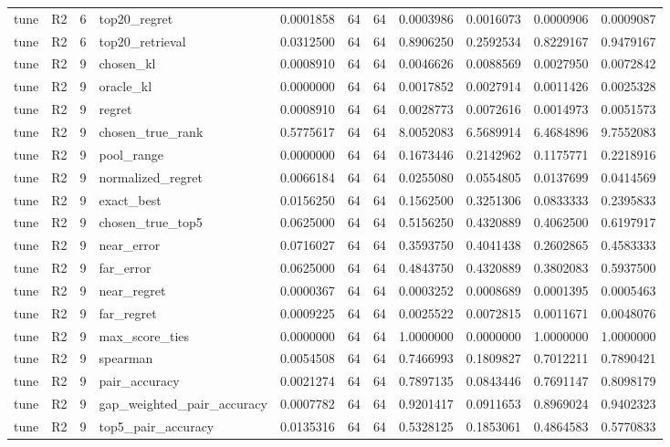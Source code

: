 \begin{tabular}{llrlrrrrrrr}
tune & R2 & 6 & top20_regret & 0.0001858 & 64 & 64 & 0.0003986 & 0.0016073 & 0.0000906 & 0.0009087 \\
tune & R2 & 6 & top20_retrieval & 0.0312500 & 64 & 64 & 0.8906250 & 0.2592534 & 0.8229167 & 0.9479167 \\
tune & R2 & 9 & chosen_kl & 0.0008910 & 64 & 64 & 0.0046626 & 0.0088569 & 0.0027950 & 0.0072842 \\
tune & R2 & 9 & oracle_kl & 0.0000000 & 64 & 64 & 0.0017852 & 0.0027914 & 0.0011426 & 0.0025328 \\
tune & R2 & 9 & regret & 0.0008910 & 64 & 64 & 0.0028773 & 0.0072616 & 0.0014973 & 0.0051573 \\
tune & R2 & 9 & chosen_true_rank & 0.5775617 & 64 & 64 & 8.0052083 & 6.5689914 & 6.4684896 & 9.7552083 \\
tune & R2 & 9 & pool_range & 0.0000000 & 64 & 64 & 0.1673446 & 0.2142962 & 0.1175771 & 0.2218916 \\
tune & R2 & 9 & normalized_regret & 0.0066184 & 64 & 64 & 0.0255080 & 0.0554805 & 0.0137699 & 0.0414569 \\
tune & R2 & 9 & exact_best & 0.0156250 & 64 & 64 & 0.1562500 & 0.3251306 & 0.0833333 & 0.2395833 \\
tune & R2 & 9 & chosen_true_top5 & 0.0625000 & 64 & 64 & 0.5156250 & 0.4320889 & 0.4062500 & 0.6197917 \\
tune & R2 & 9 & near_error & 0.0716027 & 64 & 64 & 0.3593750 & 0.4041438 & 0.2602865 & 0.4583333 \\
tune & R2 & 9 & far_error & 0.0625000 & 64 & 64 & 0.4843750 & 0.4320889 & 0.3802083 & 0.5937500 \\
tune & R2 & 9 & near_regret & 0.0000367 & 64 & 64 & 0.0003252 & 0.0008689 & 0.0001395 & 0.0005463 \\
tune & R2 & 9 & far_regret & 0.0009225 & 64 & 64 & 0.0025522 & 0.0072815 & 0.0011671 & 0.0048076 \\
tune & R2 & 9 & max_score_ties & 0.0000000 & 64 & 64 & 1.0000000 & 0.0000000 & 1.0000000 & 1.0000000 \\
tune & R2 & 9 & spearman & 0.0054508 & 64 & 64 & 0.7466993 & 0.1809827 & 0.7012211 & 0.7890421 \\
tune & R2 & 9 & pair_accuracy & 0.0021274 & 64 & 64 & 0.7897135 & 0.0843446 & 0.7691147 & 0.8098179 \\
tune & R2 & 9 & gap_weighted_pair_accuracy & 0.0007782 & 64 & 64 & 0.9201417 & 0.0911653 & 0.8969024 & 0.9402323 \\
tune & R2 & 9 & top5_pair_accuracy & 0.0135316 & 64 & 64 & 0.5328125 & 0.1853061 & 0.4864583 & 0.5770833 \\

\end{tabular}
